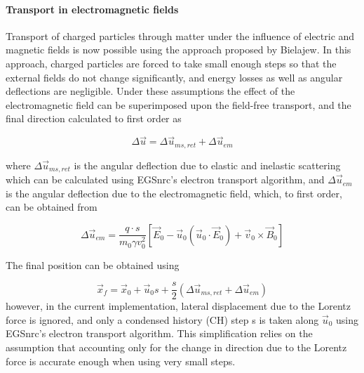 \paragraph{Transport in electromagnetic fields} \hfill
\label{EMF_macros_algorithm}

Transport of charged particles through matter under the influence of electric and magnetic fields is now possible
using the approach proposed by Bielajew\cite{Bi89a}. In this approach, charged particles are forced
to take small enough steps so that the external fields do not change significantly, and energy losses as well
as angular deflections are negligible. Under these assumptions the effect of the electromagnetic field can
be superimposed upon the field-free transport, and the final direction calculated to first order as

\begin{equation}
\Delta\vec{u} = \Delta\vec{u}_{ms,ret} + \Delta\vec{u}_{em}
\end{equation}

where $\Delta\vec{u}_{ms,ret}$ is the angular deflection due to elastic and inelastic scattering which
can be calculated using EGSnrc's electron transport algorithm, and $\Delta\vec{u}_{em}$ is the angular
deflection due to the electromagnetic field, which, to first order, can be obtained from

\begin{equation}
\label{uchange_emf}
    \Delta\vec{u}_{em} = \frac{q \cdot s}{m_0 \gamma v^2_0} \left[\vec{E}_0 - \vec{u}_0(\vec{u}_0\cdot \vec{E}_0) + \vec{v}_0 \times \vec{B}_0\right]
\end{equation}

The final position can be obtained using

\begin{equation}
    \vec{x}_f = \vec{x}_0 + \vec{u}_0 s + \frac{s}{2} \left(\Delta\vec{u}_{ms,ret} + \Delta\vec{u}_{em}\right)
\end{equation}
however, in the current implementation, lateral displacement due to the Lorentz force is ignored, and only a condensed history (CH) step s is taken along $\vec{u}_0$ using EGSnrc's electron transport algorithm. This simplification relies on the assumption that accounting only for the change in direction due to the Lorentz force is accurate enough when using very small steps.

